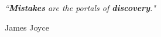 \documentclass[11pt, oneside]{Thesis} %
\begin{document}
\pagestyle{empty} %

\null\vfill %

\textit{``\textbf{Mistakes} are the portals of \textbf{discovery}."}

\begin{flushright}
    James Joyce
\end{flushright}

\vfill\vfill\vfill\vfill\vfill\vfill\null %

\clearpage %



\end{document}
